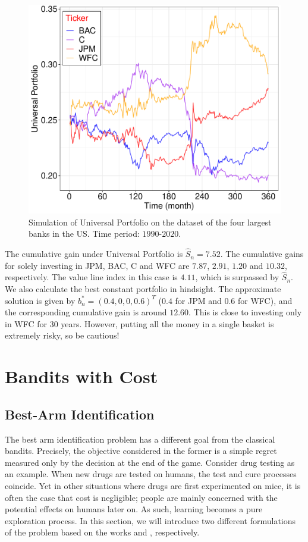 \documentclass[letterpaper,11pt,openright,openany]{book}
\numberwithin{equation}{section}
\theoremstyle{plain}
\theoremstyle{definition}
\begin{document}
\begin{figure}[h!]
\centering
  \includegraphics[width=9 cm]{UP.pdf}
  \caption{Simulation of Universal Portfolio on the dataset of the four largest banks in the US. Time period: $1990$-$2020$. }
  \label{fig:UP}
\end{figure}

The cumulative gain under Universal Portfolio is $\hat{S}_n = 7.52$. The cumulative gains for solely investing in JPM, BAC, C and WFC are $7.87$, $2.91$, $1.20$ and $10.32$, respectively. 
The value line index in this case is $4.11$, which is surpassed by $\hat{S}_n$. We also calculate the best constant portfolio in hindsight. 
The approximate solution is given by $b_n^*=(0.4, 0, 0, 0.6)^T$ ($0.4$ for JPM and $0.6$ for WFC), and the corresponding cumulative gain is around $12.60$. This is close to investing only in WFC for $30$ years.  
However, putting all the money in a single basket is extremely risky, so be cautious! 




\chapter{Bandits with Cost}
\section{Best-Arm Identification}
The best arm identification problem has a different goal from the classical bandits. Precisely, the objective considered in the former is a simple regret measured only by the decision at the end of the game. Consider drug testing as an example. When new drugs are tested on humans, the test and cure processes coincide. Yet in other situations where drugs are first experimented on mice, it is often the case that cost is negligible; people are mainly concerned with the potential effects on humans later on. As such, learning becomes a pure exploration process. In this section, we will introduce two different formulations of the problem based on the works \cite{audibert2010best,  bubeck2009pure} and \cite{garivier2016optimal}, respectively. 
\end{document}
